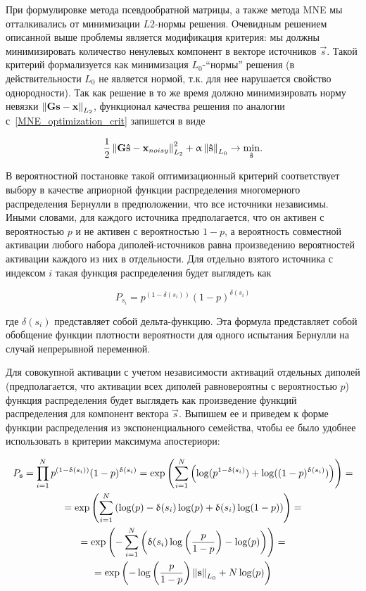 При формулировке метода псевдообратной матрицы, а также метода MNE мы
отталкивались от минимизации $L2$-нормы решения. Очевидным решением описанной
выше проблемы является модификация критерия: мы должны минимизировать
количество ненулевых компонент в векторе источников $\vec{s}$. Такой
критерий формализуется как минимизация $L_0$-``нормы'' решения (в действительности $L_0$ не является нормой,
т.к. для нее нарушается свойство однородности). Так как решение в то же время
должно минимизировать норму невязки $\left\lVert\mathbf{Gs - x}\right\rVert_{L_2}$, функционал
качества решения по аналогии с~\ref{MNE_optimization_crit} запишется в виде

\begin{equation}
    \frac{1}{2}\left\lVert\mathbf{G\hat{s} - x}_{noisy}\right\rVert^2_{L_2} + \upalpha\left\lVert\mathbf{\hat{s}}\right\rVert_{L_0}
    \rightarrow \underset{\mathbf{\hat{s}}}{\min}.
    \label{l0_optimization_crit}
\end{equation}

В вероятностной постановке такой оптимизационный критерий соответствует
выбору в качестве априорной функции распределения многомерного распределения
Бернулли в предположении, что все источники независимы. Иными словами,
для каждого источника предполагается, что он активен с вероятностью
$p$ и не активен с вероятностью $1-p$, а вероятность совместной активации
любого набора диполей-источников равна произведению вероятностей активации
каждого из них в отдельности.
Для отдельно взятого источника с индексом
$i$ такая функция распределения будет выглядеть как

\begin{equation}
    P_{s_i} = p^{(1 - \delta(s_i))} (1-p)^{\delta(s_i)}
\end{equation}

где $\delta(s_i)$ представляет собой дельта-функцию. Эта формула представляет
собой обобщение функции плотности вероятности для одного испытания Бернулли
на случай непрерывной переменной.

Для совокупной активации с учетом независимости активаций отдельных диполей
(предполагается, что активации всех диполей равновероятны с вероятностью $p$)
функция распределения будет выглядеть как произведение функций распределения
для компонент вектора $\vec{s}$. Выпишем ее и приведем к форме функции
распределения из экспоненциального семейства, чтобы ее было удобнее использовать
в критерии максимума апостериори:

\begin{multline}
    P_{\mathbf{s}} = \prod_{i=1}^{N} p^{(1-\updelta(s_i))} (1-p)^{\updelta(s_i)}=
    \exp\left(\sum_{i=1}^N \left(\log(p^{1-\updelta(s_i)}) + \log((1-p)^{\updelta(s_i)})\right)\right)=\\
    =\exp\left(\sum_{i=1}^N \left(\log(p) - \updelta(s_i) \log(p) + \updelta(s_i)\log(1-p)\right)\right)=\\
    =\exp\left(-\sum_{i=1}^N \left(\updelta(s_i) \log\left(\frac{p}{1-p}\right) - \log(p)\right)\right) = \\
    =\exp\left(-\log\left(\frac{p}{1-p}\right) \left\lVert\mathbf{s}\right\rVert_{L_0} + N\log(p)\right)
    \label{l0_multivariate_bernoulli_distribution}
\end{multline}

